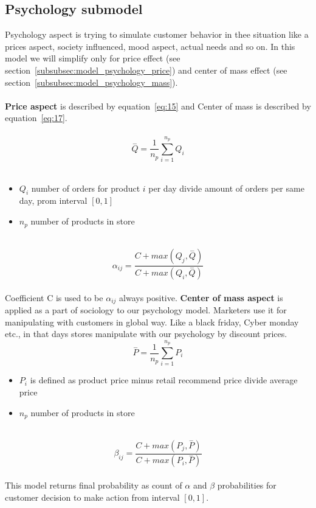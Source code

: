 \subsection{Psychology submodel} \label{subsec:model_psychology}
Psychology aspect is trying to simulate customer behavior in thee situation like a prices aspect, society influenced, mood aspect, actual needs
and so on.
In this model we will simplify only for price effect (see section~\ref{subsubsec:model_psychology_price}) and center of mass effect (see section~\ref{subsubsec:model_psychology_mass}).\\
\\
\textbf{Price aspect} \label{subsubsec:model_psychology_price} is described by equation~\ref{eq:15} and Center of mass is described by equation~\ref{eq:17}.\\
\\
\begin{equation} \label{eq:15}
\overset{-}{Q} = \frac{1}{n_p} \sum_{i=1}^{n_p} Q_i
\end{equation}
\\
\begin{itemize}
    \item $Q_i$ number of orders for product $i$ per day divide amount of orders per same day, prom interval $[0,1]$
    \item $n_p$ number of products in store
\end{itemize}
\\
\begin{equation} \label{eq:16}
\alpha_{ij} = \frac{C+max(Q_j, \overset{-}{Q})}{C+max(Q_i, \overset{-}{Q})}
\end{equation}
\\
Coefficient C is used to be $\alpha_{ij}$ always positive.
\textbf{Center of mass aspect} \label{subsubsec:model_psychology_mass} is applied as a part of sociology to our psychology model.
Marketers use it for manipulating with customers in global way.
Like a black friday, Cyber monday etc., in that days stores manipulate with our psychology by discount prices.
\\
\begin{equation} \label{eq:17}
\overset{-}{P} = \frac{1}{n_p} \sum_{i=1}^{n_p} P_i
\end{equation}
\begin{itemize}
    \item $P_i$ is defined as product price minus retail recommend price divide average price
    \item $n_p$ number of products in store
\end{itemize}
\\
\begin{equation} \label{eq:18}
\beta_{ij} = \frac{C+max(P_j, \overset{-}{P})}{C+max(P_i, \overset{-}{P})}
\end{equation}
\\
This model returns final probability as count of $\alpha$ and $\beta$ probabilities for customer decision to make action from interval $[0,1]$.
\\

